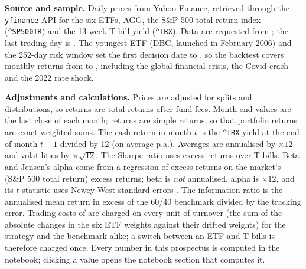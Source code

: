 \textbf{Source and sample.} Daily prices from Yahoo Finance, retrieved through the \texttt{yfinance} API for the six ETFs,
AGG, the S\&P 500 total return index (\texttt{\textasciicircum SP500TR}) and the 13-week T-bill yield (\texttt{\textasciicircum IRX}).
Data are requested from ; the last trading day is . The youngest ETF (DBC, launched in February 2006) and the 252-day
risk window set the first decision date to , so the backtest covers  monthly returns
from  to , including the global financial crisis, the Covid crash and the 2022 rate shock.

\textbf{Adjustments and calculations.} Prices are adjusted for splits and distributions, so returns are total returns
after fund fees. Month-end values are the last close of each month; returns are simple returns, so that portfolio returns
are exact weighted sums. The cash return in month $t$ is the \texttt{\textasciicircum IRX} yield at the end of month $t-1$
divided by 12 (on average  p.a.). Averages are annualised by $\times 12$ and volatilities by $\times\sqrt{12}$.
The Sharpe ratio uses excess returns over T-bills. Beta and Jensen's alpha come from a regression of excess returns on the
market's (S\&P 500 total return) excess returns; beta is \emph{not} annualised, alpha is $\times 12$, and its $t$-statistic
uses Newey-West standard errors \citep{newey1987}. The information ratio is the annualised mean return in excess of the
60/40 benchmark divided by the tracking error. Trading costs of  are charged on every unit of turnover
(the sum of the absolute changes in the six ETF weights against their drifted weights) for the strategy and the
benchmark alike; a switch between an ETF and T-bills is therefore charged once. Every number in
this prospectus is computed in the notebook; clicking a value opens the notebook section that computes it.
